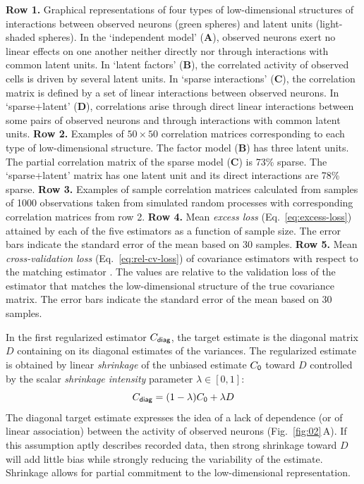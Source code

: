\documentclass[10pt]{article}
\begin{document}
\begin{FPfigure}
{        {\bf Row 1.} Graphical representations of four types of low-dimensional structures of interactions between observed neurons (green spheres) and latent units (light-shaded spheres).
        In the `independent model' ({\bf A}), observed neurons exert no linear effects on one another neither directly nor through interactions with common latent units. 
        In `latent factors' ({\bf B}), the correlated activity of observed cells is driven by several latent units. 
        In `sparse interactions' ({\bf C}), the correlation matrix is defined by a set of linear interactions between observed neurons. 
        In `sparse+latent' ({\bf D}), correlations arise through direct linear interactions between some pairs of observed neurons and through interactions with common latent units. 
        {\bf Row 2.} Examples of $50\times 50$ correlation matrices corresponding to each type of low-dimensional structure. 
        The factor model ({\bf B}) has three latent units. 
        The partial correlation matrix of the sparse model ({\bf C}) is 73\% sparse.
        The `sparse+latent' matrix has one latent unit and its direct interactions are 78\% sparse.
        {\bf Row 3.} Examples of sample correlation matrices calculated from samples of 1000 observations taken from simulated random processes with corresponding correlation matrices from row 2.
        {\bf Row 4.} Mean \emph{excess loss} (Eq.~\ref{eq:excess-loss}) attained by each of the five estimators as a function of sample size. The error bars indicate the standard error of the mean based on 30 samples.
        {\bf Row 5.} Mean \emph{cross-validation loss} (Eq.~\ref{eq:rel-cv-loss}) of covariance estimators with respect to the matching estimator . The values are relative to the validation loss of the estimator that matches the low-dimensional structure of the true covariance matrix. The error bars indicate the standard error of the mean based on 30 samples.
    }
    \label{fig:02}
\end{FPfigure} 

In the first regularized estimator $C_{\sf diag}$, the target estimate is the diagonal matrix $D$ containing on its diagonal estimates of the variances.
The regularized estimate is obtained by linear \emph{shrinkage} of the unbiased estimate $C_{\sf 0}$ toward $D$ controlled by the scalar \emph{shrinkage intensity} parameter $\lambda \in [0, 1]$:
\begin{equation}
C_{\sf diag} = (1-\lambda) C_{\sf 0} + \lambda D
\end{equation}
The diagonal target estimate expresses the idea of a lack of dependence (or of linear association) between the activity of observed neurons (Fig.~\ref{fig:02}\,A).  
If this assumption aptly describes recorded data, then strong shrinkage toward $D$ will add little bias while strongly reducing the variability of the estimate. Shrinkage allows for partial commitment to the low-dimensional representation.  
\end{document}
